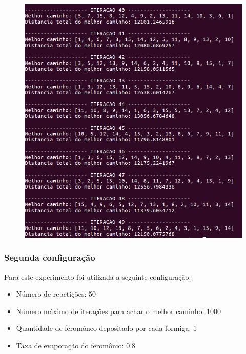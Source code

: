 \documentclass[hidelinks,12pt]{article}
\begin{document}
		\newpage
		
		\begin{figure}[!h]
			\centering
			\includegraphics[scale=0.6]{Figures/m15-1-5.png}
		\end{figure}
		
		\newpage
		
		\subsubsection{Segunda configuração}
		 	Para este experimento foi utilizada a seguinte configuração:

		 	\begin{itemize}
				\item Número de repetições: 50
				\item Número máximo de iterações para achar o melhor caminho: 1000
				\item Quantidade de feromôneo depositado por cada formiga: 1
				\item Taxa de evaporação do feromônio: 0.8
			\end{itemize}

		\newpage	
\end{document}
